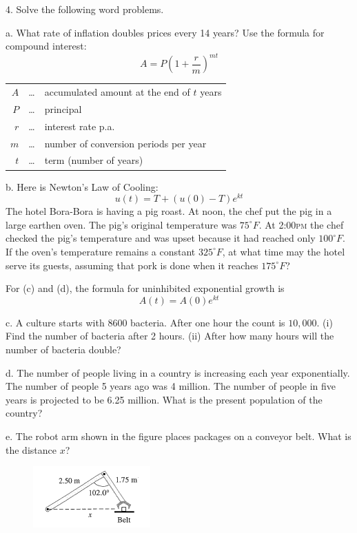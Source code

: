 \documentclass[11pt]{article}
\begin{document}
4. Solve the following word problems.

a. What rate of inflation doubles prices every 14 years? Use the
formula for compound interest:
\begin{equation}
  \label{eq:quahphia}
    A=P\left(1+\frac{r}{m}\right)^{mt}
\end{equation}
\begin{tabular}{rcl}
  $A$&\ldots&accumulated amount at the end of $t$ years \\
  $P$&\ldots&principal \\
  $r$&\ldots&interest rate p.a. \\
  $m$&\ldots&number of conversion periods per year \\
  $t$&\ldots&term (number of years)
\end{tabular}

b. Here is Newton's Law of Cooling:
\begin{equation}
  \label{eq:iemahbec}
  u(t)=T+(u(0)-T)e^{kt}
\end{equation}
The hotel Bora-Bora is having a pig roast. At noon, the chef put the
pig in a large earthen oven. The pig's original temperature was
$75^{\circ}F$. At 2:00\textsc{pm} the chef checked the pig's
temperature and was upset because it had reached only $100^{\circ}F$.
If the oven's temperature remains a constant $325^{\circ}F$, at what
time may the hotel serve its guests, assuming that pork is done when
it reaches $175^{\circ}F$?

For (c) and (d), the formula for uninhibited exponential growth is
\begin{equation}
  \label{eq:xufuacoo}
  A(t)=A(0)e^{kt}
\end{equation}

c. A culture starts with 8600 bacteria. After one hour the count is
$10,000$. (i) Find the number of bacteria after 2 hours. (ii) After
how many hours will the number of bacteria double?

d. The number of people living in a country is increasing each year
exponentially. The number of people 5 years ago was 4 million. The
number of people in five years is projected to be 6.25 million. What
is the present population of the country?

\newpage

e. The robot arm shown in the figure places packages on a conveyor
belt. What is the distance $x$?

\begin{figure}[h]
   \includegraphics[scale=.5]{./tri-01.png}
\end{figure}
\end{document}
